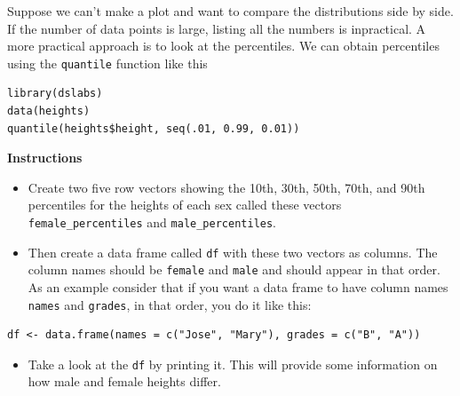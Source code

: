 \documentclass[]{article}
\providecommand{\tightlist}{%
  \setlength{\itemsep}{0pt}\setlength{\parskip}{0pt}}
\begin{document}
Suppose we can't make a plot and want to compare the distributions side
by side. If the number of data points is large, listing all the numbers
is inpractical. A more practical approach is to look at the percentiles.
We can obtain percentiles using the \texttt{quantile} function like this

\begin{verbatim}
library(dslabs)
data(heights)
quantile(heights$height, seq(.01, 0.99, 0.01))
\end{verbatim}

\textbf{Instructions}

\begin{itemize}
\tightlist
\item
  Create two five row vectors showing the 10th, 30th, 50th, 70th, and
  90th percentiles for the heights of each sex called these vectors
  \texttt{female\_percentiles} and \texttt{male\_percentiles}.
\item
  Then create a data frame called \texttt{df} with these two vectors as
  columns. The column names should be \texttt{female} and \texttt{male}
  and should appear in that order. As an example consider that if you
  want a data frame to have column names \texttt{names} and
  \texttt{grades}, in that order, you do it like this:
\end{itemize}

\begin{verbatim}
df <- data.frame(names = c("Jose", "Mary"), grades = c("B", "A"))
\end{verbatim}

\begin{itemize}
\tightlist
\item
  Take a look at the \texttt{df} by printing it. This will provide some
  information on how male and female heights differ.
\end{itemize}
\end{document}
